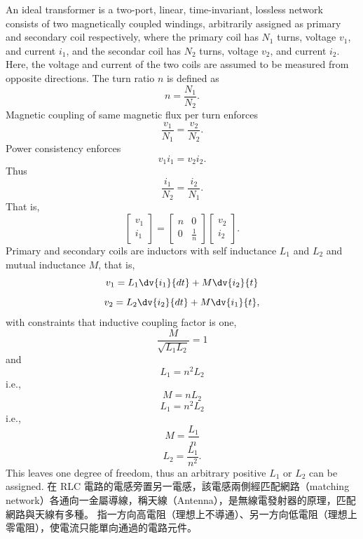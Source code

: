 \documentclass[a4paper,12pt]{report}
\begin{document}
\begin{itemize}
An ideal transformer is a two-port, linear, time-invariant, lossless network consists of two magnetically coupled windings, arbitrarily assigned as primary and secondary coil respectively, where the primary coil has $N_1$ turns, voltage $v_1$, and current $i_1$, and the secondar coil has $N_2$ turns, voltage $v_2$, and current $i_2$. Here, the voltage and current of the two coils are assumed to be measured from opposite directions. The turn ratio $n$ is defined as
\[n=\frac{N_1}{N_2}.\]
Magnetic coupling of same magnetic flux per turn enforces
\[\frac{v_1}{N_1}=\frac{v_2}{N_2}.\]
Power consistency enforces 
\[v_1i_1=v_2i_2.\]
Thus
\[\frac{i_1}{N_2}=\frac{i_2}{N_1}.\]
That is,
\[\begin{bmatrix}v_1\\i_1\end{bmatrix}=\begin{bmatrix}n&0\\0&\frac{1}{n}\end{bmatrix}\begin{bmatrix}v_2\\i_2\end{bmatrix}.\]
Primary and secondary coils are inductors with self inductance $L_1$ and $L_2$ and mutual inductance $M$, that is,
\[v_1=L_1\dv{i_1}{dt}+M\dv{i_2}{t}\]
\[v_2=L_2\dv{i_2}{dt}+M\dv{i_1}{t},\]
with constraints that inductive coupling factor is one,
\[\frac{M}{\sqrt{L_1L_2}}=1\]
and
\[L_1=n^2L_2\]
i.e.,
\[M=nL_2\]
\[L_1=n^2L_2\]
i.e.,
\[M=\frac{L_1}{n}\]
\[L_2=\frac{L_1}{n^2}.\]
This leaves one degree of freedom, thus an arbitrary positive $L_1$ or $L_2$ can be assigned.
在 RLC 電路的電感旁置另一電感，該電感兩側經匹配網路（matching network）各通向一金屬導線，稱天線（Antenna），是無線電發射器的原理，匹配網路與天線有多種。
指一方向高電阻（理想上不導通）、另一方向低電阻（理想上零電阻），使電流只能單向通過的電路元件。



\end{itemize}
\end{document}
